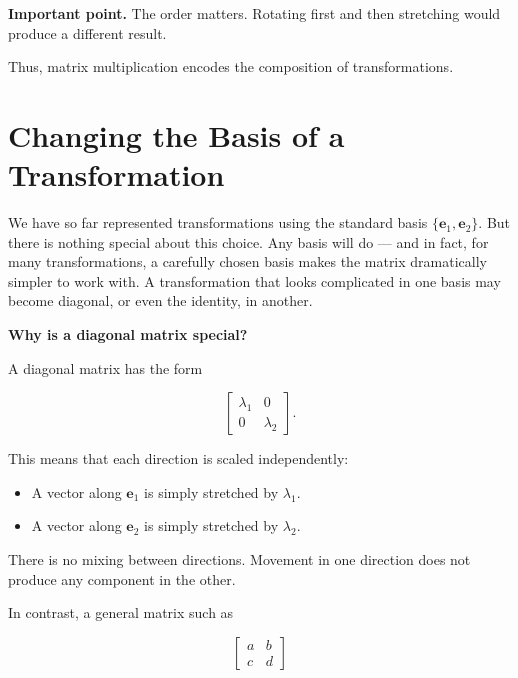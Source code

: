 \documentclass[11pt,openany]{book}
\theoremstyle{definition}
\begin{document}
\textbf{Important point.} The order matters. Rotating first and then stretching would produce 
a different result.

\medskip

Thus, matrix multiplication encodes the composition of transformations.

\section{Changing the Basis of a Transformation}

We have so far represented transformations using the standard basis 
$\{\mathbf{e}_1, \mathbf{e}_2\}$. But there is nothing special about this choice. 
Any basis will do --- and in fact, for many transformations, a carefully chosen basis 
makes the matrix dramatically simpler to work with. A transformation that looks complicated 
in one basis may become diagonal, or even the identity, in another.

\medskip

\medskip

\textbf{Why is a diagonal matrix special?}

\medskip

A diagonal matrix has the form

\[
\begin{bmatrix}
\lambda_1 & 0 \\
0 & \lambda_2
\end{bmatrix}.
\]

\medskip

This means that each direction is scaled independently:

\begin{itemize}
  \item A vector along $\mathbf{e}_1$ is simply stretched by $\lambda_1$.
  \item A vector along $\mathbf{e}_2$ is simply stretched by $\lambda_2$.
\end{itemize}

\medskip

There is no mixing between directions. Movement in one direction does not produce 
any component in the other.

\medskip

In contrast, a general matrix such as

\[
\begin{bmatrix}
a & b \\
c & d
\end{bmatrix}
\]
\end{document}
